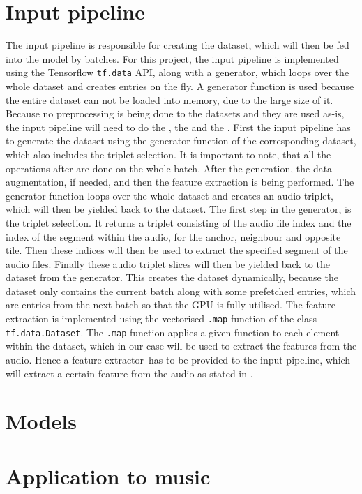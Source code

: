 \section{Input pipeline}
\label{sec:Input-Pipeline}
The input pipeline is responsible for creating the dataset, which will then be fed into the model by batches. For this project, the input pipeline is implemented using the Tensorflow \texttt{tf.data} API\footnotemark, along with a generator, which loops over the whole dataset and creates entries on the fly. A generator function is used because the entire dataset can not be loaded into memory, due to the large size of it.
\newline
\newline
Because no preprocessing is being done to the datasets and they are used as-is, the input pipeline will need to do the , the  and the .
\newline
First the input pipeline has to generate the dataset using the generator function of the corresponding dataset, which also includes the triplet selection. It is important to note, that all the operations after are done on the whole batch. After the generation, the data augmentation, if needed, and then the feature extraction is being performed.
\newline
\newline
The generator function loops over the whole dataset and creates an audio triplet, which will then be yielded back to the dataset. The first step in the generator, is the triplet selection. It returns a triplet consisting of the audio file index and the index of the segment within the audio, for the anchor, neighbour and opposite tile. Then these indices will then be used to extract the specified segment of the audio files. Finally these audio triplet slices will then be yielded back to the dataset from the generator.
\newline
\newline
This creates the dataset dynamically, because the dataset only contains the current batch along with some prefetched entries, which are entries from the next batch so that the \gls{GPU} is fully utilised.
\newline
\newline
The feature extraction is implemented using the vectorised \texttt{.map} function of the class \texttt{tf.data.Dataset}\footnotemark. The \texttt{.map} function applies a given function to each element within the dataset, which in our case will be used to extract the features from the audio. Hence a \flqq feature extractor\frqq \ has to be provided to the input pipeline, which will extract a certain feature from the audio as stated in .

\section{Models}
\label{sec:Models}

\section{Application to music}
\label{sec:Application-Music}
